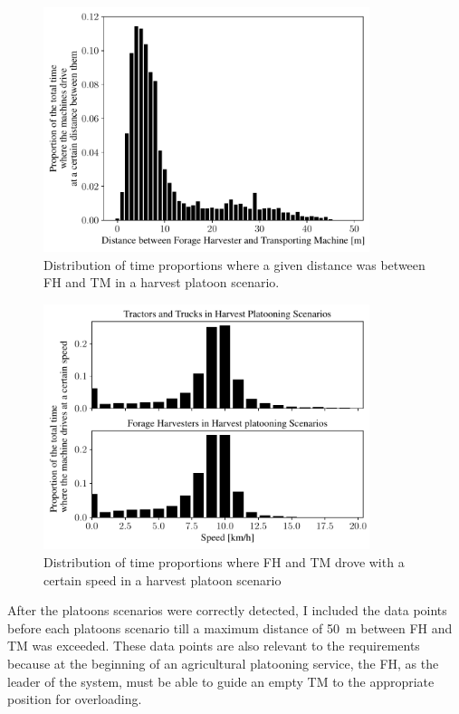 \begin{figure}%
	\centering
	\includegraphics[width=0.85\textwidth]{figures/distanceHarvestSzenario.pdf}
	\caption{Distribution of time proportions where a given distance was between \ac{FH} and \ac{TM} in a harvest platoon scenario.}%
	\label{fig:distance}%
\end{figure}
\begin{figure}%
	\centering
	\includegraphics[width=0.85\textwidth]{figures/speedHarvestSzenario.pdf}
	\caption{Distribution of time proportions where \ac{FH} and \ac{TM} drove with a certain speed in a harvest platoon scenario}%
	\label{fig:speed}%
\end{figure}

After the platoons scenarios were correctly detected, I included the data points before each platoons scenario till a maximum distance of \SI{50}{\metre} between \ac{FH} and \ac{TM} was exceeded. These data points are also relevant to the requirements because at the beginning of an agricultural platooning service, the \ac{FH}, as the leader of the system, must be able to guide an empty \ac{TM} to the appropriate position for overloading.

